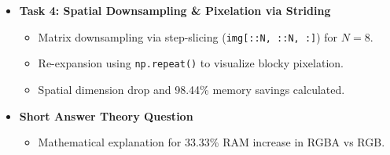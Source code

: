 \documentclass[12pt,a4paper]{article}
\begin{document}
\begin{mdframed}[backgroundcolor=gray!5, linecolor=tasktitleblue, linewidth=1pt, roundcorner=4pt]
\begin{itemize}[label=$\checkmark$, leftmargin=2em]
        \vspace{0.3em}
        \item \textbf{Task 4: Spatial Downsampling \& Pixelation via Striding}
        \begin{itemize}[label=$\bullet$, leftmargin=1.5em]
            \item Matrix downsampling via step-slicing (\texttt{img[::N, ::N, :]}) for $N=8$.
            \item Re-expansion using \texttt{np.repeat()} to visualize blocky pixelation.
            \item Spatial dimension drop and 98.44\% memory savings calculated.
        \end{itemize}
        
        \vspace{0.3em}
        \item \textbf{Short Answer Theory Question}
        \begin{itemize}[label=$\bullet$, leftmargin=1.5em]
            \item Mathematical explanation for 33.33\% RAM increase in RGBA vs RGB.
        \end{itemize}
    \end{itemize}
\end{mdframed}

\newpage
\end{document}
